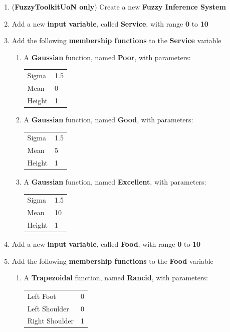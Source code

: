 \begin{enumerate}
\item (\textbf{FuzzyToolkitUoN only}) Create a new \textbf{Fuzzy Inference System}
\item Add a new \textbf{input variable}, called \textbf{Service}, with range \textbf{0} to \textbf{10}
\item Add the following \textbf{membership functions} to the \textbf{Service} variable
	\begin{enumerate}
	\item A \textbf{Gaussian} function, named \textbf{Poor}, with parameters:\\
	\begin{tabular}{ll}
	Sigma 	& 1.5 \\
	Mean	& 0   \\
	Height	& 1   \\
	\end{tabular}
	\item A \textbf{Gaussian} function, named \textbf{Good}, with parameters:\\
	\begin{tabular}{ll}
	Sigma 	& 1.5 \\
	Mean	& 5   \\
	Height	& 1   \\
	\end{tabular}	
	\item A \textbf{Gaussian} function, named \textbf{Excellent}, with parameters:\\
	\begin{tabular}{ll}
	Sigma 	& 1.5 \\
	Mean	& 10   \\
	Height	& 1   \\
	\end{tabular}	
	\end{enumerate}
\item Add a new \textbf{input variable}, called \textbf{Food}, with range \textbf{0} to \textbf{10}	
\item Add the following \textbf{membership functions} to the \textbf{Food} variable
	\begin{enumerate}
	\item A \textbf{Trapezoidal} function, named \textbf{Rancid}, with parameters:\\
	\begin{tabular}{ll}
	Left Foot 		& 0		\\
	Left Shoulder 	& 0		\\
	Right Shoulder 	& 1		\\

\end{tabular}
\end{enumerate}
\end{enumerate}
